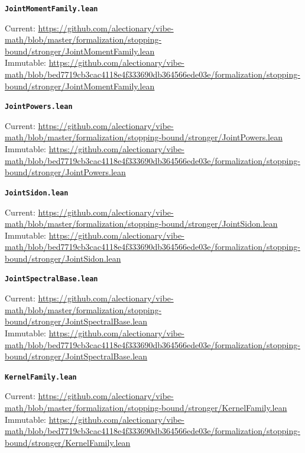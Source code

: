 \smallskip
\medskip
\par\noindent\textbf{\texttt{JointMomentFamily.lean}}\par\nopagebreak
{\footnotesize\noindent Current: \url{https://github.com/alectionary/vibe-math/blob/master/formalization/stopping-bound/stronger/JointMomentFamily.lean}\\
Immutable: \url{https://github.com/alectionary/vibe-math/blob/bed7719cb3cac4118e4f333690db364566ede03e/formalization/stopping-bound/stronger/JointMomentFamily.lean}\par}
\smallskip
\medskip
\par\noindent\textbf{\texttt{JointPowers.lean}}\par\nopagebreak
{\footnotesize\noindent Current: \url{https://github.com/alectionary/vibe-math/blob/master/formalization/stopping-bound/stronger/JointPowers.lean}\\
Immutable: \url{https://github.com/alectionary/vibe-math/blob/bed7719cb3cac4118e4f333690db364566ede03e/formalization/stopping-bound/stronger/JointPowers.lean}\par}
\smallskip
\medskip
\par\noindent\textbf{\texttt{JointSidon.lean}}\par\nopagebreak
{\footnotesize\noindent Current: \url{https://github.com/alectionary/vibe-math/blob/master/formalization/stopping-bound/stronger/JointSidon.lean}\\
Immutable: \url{https://github.com/alectionary/vibe-math/blob/bed7719cb3cac4118e4f333690db364566ede03e/formalization/stopping-bound/stronger/JointSidon.lean}\par}
\smallskip
\medskip
\par\noindent\textbf{\texttt{JointSpectralBase.lean}}\par\nopagebreak
{\footnotesize\noindent Current: \url{https://github.com/alectionary/vibe-math/blob/master/formalization/stopping-bound/stronger/JointSpectralBase.lean}\\
Immutable: \url{https://github.com/alectionary/vibe-math/blob/bed7719cb3cac4118e4f333690db364566ede03e/formalization/stopping-bound/stronger/JointSpectralBase.lean}\par}
\smallskip
\medskip
\par\noindent\textbf{\texttt{KernelFamily.lean}}\par\nopagebreak
{\footnotesize\noindent Current: \url{https://github.com/alectionary/vibe-math/blob/master/formalization/stopping-bound/stronger/KernelFamily.lean}\\
Immutable: \url{https://github.com/alectionary/vibe-math/blob/bed7719cb3cac4118e4f333690db364566ede03e/formalization/stopping-bound/stronger/KernelFamily.lean}\par}
